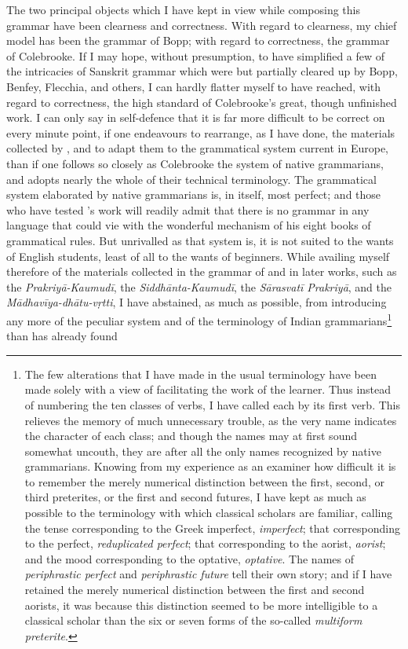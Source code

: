The two principal objects which I have kept in view while composing this
grammar have been clearness and correctness. With regard to clearness,
my chief model has been the grammar of Bopp; with regard to correctness,
the grammar of Colebrooke. If I may hope, without presumption, to have
simplified a few of the intricacies of Sanskrit grammar which were but
partially cleared up by Bopp, Benfey, Flecchia, and others, I can hardly
flatter myself to have reached, with regard to correctness, the high
standard of Colebrooke's great, though unfinished work. I can only say
in self-defence that it is far more difficult to be correct on every
minute point, if one endeavours to rearrange, as I have done, the
materials collected by \panini{}, and to adapt them to the grammatical
system current in Europe, than if one follows so closely as Colebrooke
the system of native grammarians, and adopts nearly the whole of their
technical terminology. The grammatical system elaborated by native
grammarians is, in itself, most perfect; and those who have tested
\panini{}'s work will readily admit that there is no grammar in any
language that could vie with the wonderful mechanism of his eight books
of grammatical rules. But unrivalled as that system is, it is not suited
to the wants of English students, least of all to the wants of
beginners. While availing myself therefore of the materials collected in
the grammar of \panini{} and in later works, such as the
\emph{Prakriyā-Kaumudī}, the \emph{Siddhānta-Kaumudī}, the
\emph{Sārasvatī Prakriyā}, and the \emph{Mādhavīya-dhātu-vṛtti}, I have
abstained, as much as possible, from introducing any more of the
peculiar system and of the terminology of Indian
grammarians\footnote{The few alterations that I have made in the usual
  terminology have been made solely with a view of facilitating the work
  of the learner. Thus instead of numbering the ten classes of verbs, I
  have called each by its first verb. This relieves the memory of much
  unnecessary trouble, as the very name indicates the character of each
  class; and though the names may at first sound somewhat uncouth, they
  are after all the only names recognized by native grammarians. Knowing
  from my experience as an examiner how difficult it is to remember the
  merely numerical distinction between the first, second, or third
  preterites, or the first and second futures, I have kept as much as
  possible to the terminology with which classical scholars are
  familiar, calling the tense corresponding to the Greek imperfect,
  \emph{imperfect}; that corresponding to the perfect,
  \emph{reduplicated perfect}; that corresponding to the aorist,
  \emph{aorist}; and the mood corresponding to the optative,
  \emph{optative}. The names of \emph{periphrastic perfect} and
  \emph{periphrastic future} tell their own story; and if I have
  retained the merely numerical distinction between the first and second
  aorists, it was because this distinction seemed to be more
  intelligible to a classical scholar than the six or seven forms of the
  so-called \emph{multiform preterite}.} than has already found
